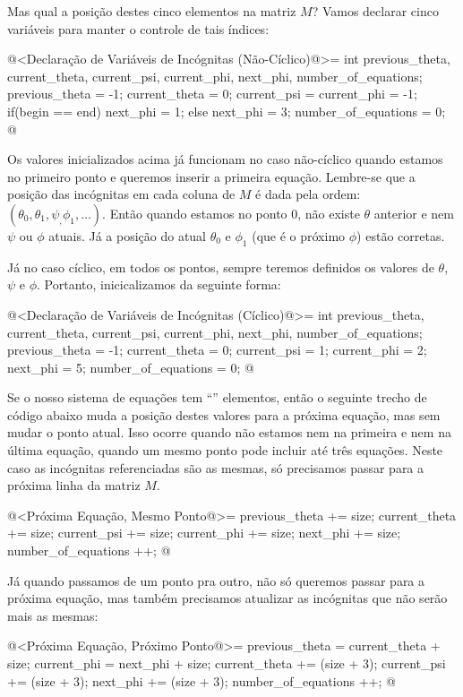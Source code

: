 Mas qual a posição destes cinco elementos na matriz $M$? Vamos declarar
cinco variáveis para manter o controle de tais índices:

\iniciocodigo
@<Declaração de Variáveis de Incógnitas (Não-Cíclico)@>=
int previous_theta, current_theta, current_psi, current_phi, next_phi,
    number_of_equations;
previous_theta = -1;
current_theta = 0;
current_psi = current_phi = -1;
if(begin == end)
  next_phi = 1;
else
  next_phi = 3;
number_of_equations = 0;
@
\fimcodigo

Os valores inicializados acima já funcionam no caso não-cíclico quando
estamos no primeiro ponto e queremos inserir a primeira
equação. Lembre-se que a posição das incógnitas em cada coluna de $M$
é dada pela ordem:
$(\theta_0, \theta_1, \psi_, \phi_1, \ldots)$. Então quando estamos no
ponto 0, não existe $\theta$ anterior e nem $\psi$ ou $\phi$
atuais. Já a posição do atual $\theta_0$ e $\phi_1$ (que é o próximo
$\phi$) estão corretas.

Já no caso cíclico, em todos os pontos, sempre teremos definidos os
valores de $\theta$, $\psi$ e $\phi$. Portanto, inicicalizamos da
seguinte forma:

\iniciocodigo
@<Declaração de Variáveis de Incógnitas (Cíclico)@>=
int previous_theta, current_theta, current_psi, current_phi, next_phi,
    number_of_equations;
previous_theta = -1;
current_theta = 0;
current_psi = 1;
current_phi = 2;
next_phi = 5;
number_of_equations = 0;
@
\fimcodigo


Se o nosso sistema de equações tem ``'' elementos,
então o seguinte trecho de código abaixo muda a posição destes valores
para a próxima equação, mas sem mudar o ponto atual. Isso ocorre
quando não estamos nem na primeira e nem na última equação, quando um
mesmo ponto pode incluir até três equações. Neste caso as incógnitas
referenciadas são as mesmas, só precisamos passar para a próxima linha
da matriz $M$.

\iniciocodigo
@<Próxima Equação, Mesmo Ponto@>=
{
  previous_theta += size;
  current_theta += size;
  current_psi += size;
  current_phi += size;
  next_phi += size;
  number_of_equations ++;
}
@
\fimcodigo

Já quando passamos de um ponto pra outro, não só queremos passar para
a próxima equação, mas também precisamos atualizar as incógnitas que
não serão mais as mesmas:

\iniciocodigo
@<Próxima Equação, Próximo Ponto@>=
{
  previous_theta = current_theta + size;
  current_phi = next_phi + size;
  current_theta += (size + 3);
  current_psi += (size + 3);
  next_phi += (size + 3);
  number_of_equations ++;
}
@
\fimcodigo

